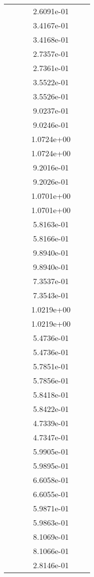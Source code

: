 \begin{xltabular}{\textwidth}{r|rS[table-format=1.3e+2]S[table-format=1.4e+2]S[table-format=1.4e+2]S[table-format=-1.5]}
&  &  & 2.6091e-01 & & \\
&  &  & 3.4167e-01 & & \\
&  &  & 3.4168e-01 & & \\
&  &  & 2.7357e-01 & & \\
&  &  & 2.7361e-01 & & \\
&  &  & 3.5522e-01 & & \\
&  &  & 3.5526e-01 & & \\
&  &  & 9.0237e-01 & & \\
&  &  & 9.0246e-01 & & \\
&  &  & 1.0724e+00 & & \\
&  &  & 1.0724e+00 & & \\
&  &  & 9.2016e-01 & & \\
&  &  & 9.2026e-01 & & \\
&  &  & 1.0701e+00 & & \\
&  &  & 1.0701e+00 & & \\
&  &  & 5.8163e-01 & & \\
&  &  & 5.8166e-01 & & \\
&  &  & 9.8940e-01 & & \\
&  &  & 9.8940e-01 & & \\
&  &  & 7.3537e-01 & & \\
&  &  & 7.3543e-01 & & \\
&  &  & 1.0219e+00 & & \\
&  &  & 1.0219e+00 & & \\
&  &  & 5.4736e-01 & & \\
&  &  & 5.4736e-01 & & \\
&  &  & 5.7851e-01 & & \\
&  &  & 5.7856e-01 & & \\
&  &  & 5.8418e-01 & & \\
&  &  & 5.8422e-01 & & \\
&  &  & 4.7339e-01 & & \\
&  &  & 4.7347e-01 & & \\
&  &  & 5.9905e-01 & & \\
&  &  & 5.9895e-01 & & \\
&  &  & 6.6058e-01 & & \\
&  &  & 6.6055e-01 & & \\
&  &  & 5.9871e-01 & & \\
&  &  & 5.9863e-01 & & \\
&  &  & 8.1069e-01 & & \\
&  &  & 8.1066e-01 & & \\
&  &  & 2.8146e-01 & & \\

\end{xltabular}
